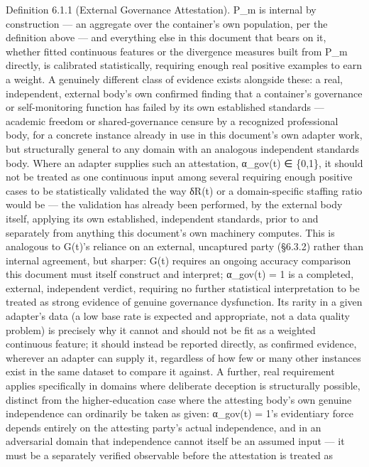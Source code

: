 \documentclass[
]{article}
\begin{document}
Definition 6.1.1 (External Governance Attestation). P\_m is internal by
construction --- an aggregate over the container's own population, per
the definition above --- and everything else in this document that bears
on it, whether fitted continuous features or the divergence measures
built from P\_m directly, is calibrated statistically, requiring enough
real positive examples to earn a weight. A genuinely different class of
evidence exists alongside these: a real, independent, external body's
own confirmed finding that a container's governance or self-monitoring
function has failed by its own established standards --- academic
freedom or shared-governance censure by a recognized professional body,
for a concrete instance already in use in this document's own adapter
work, but structurally general to any domain with an analogous
independent standards body. Where an adapter supplies such an
attestation, α\_gov(t) ∈ \{0,1\}, it should not be treated as one
continuous input among several requiring enough positive cases to be
statistically validated the way δR(t) or a domain-specific staffing
ratio would be --- the validation has already been performed, by the
external body itself, applying its own established, independent
standards, prior to and separately from anything this document's own
machinery computes. This is analogous to G(t)'s reliance on an external,
uncaptured party (§6.3.2) rather than internal agreement, but sharper:
G(t) requires an ongoing accuracy comparison this document must itself
construct and interpret; α\_gov(t) = 1 is a completed, external,
independent verdict, requiring no further statistical interpretation to
be treated as strong evidence of genuine governance dysfunction. Its
rarity in a given adapter's data (a low base rate is expected and
appropriate, not a data quality problem) is precisely why it cannot and
should not be fit as a weighted continuous feature; it should instead be
reported directly, as confirmed evidence, wherever an adapter can supply
it, regardless of how few or many other instances exist in the same
dataset to compare it against. A further, real requirement applies
specifically in domains where deliberate deception is structurally
possible, distinct from the higher-education case where the attesting
body's own genuine independence can ordinarily be taken as given:
α\_gov(t) = 1's evidentiary force depends entirely on the attesting
party's actual independence, and in an adversarial domain that
independence cannot itself be an assumed input --- it must be a
separately verified observable before the attestation is treated as
\end{document}
